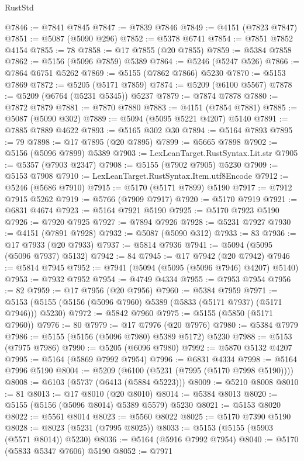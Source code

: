 \begin{lexlean}{RustStd}
\begin{coremodule}
@7846 := @7841 @7845
@7847 := @7839 @7846
@7849 := @4151 (@7823 @7847)
@7851 := @5087 (@5090 @296)
@7852 := @5378 @6741
@7854 := @7851 @7852 @4154
@7855 := 78
@7858 := @17 @7855 (@20 @7855)
@7859 := @5384 @7858
@7862 := @5156 (@5096 @7859) @5389
@7864 := @5246 (@5247 @526)
@7866 := @7864 @6751 @5262
@7869 := @5155 (@7862 @7866) @5230
@7870 := @5153 @7869
@7872 := @5205 (@5171 @7859)
@7874 := @5209 (@6100 @5567)
@7878 := @5209 (@6764 (@5231 @5345)) @5237
@7879 := @7874 @7878
@7880 := @7872 @7879
@7881 := @7870 @7880
@7883 := @4151 (@7854 @7881)
@7885 := @5087 (@5090 @302)
@7889 := @5094 (@5095 @5221 @4207) @5140
@7891 := @7885 @7889 @4622
@7893 := @5165 @302 @30
@7894 := @5164 @7893
@7895 := 79
@7898 := @17 @7895 (@20 @7895)
@7899 := @5665 @7898
@7902 := @5156 (@5096 @7899) @5389
@7903 := LexLeanTarget.RustSyntax.Lit.str
@7905 := @5357 (@7903 @2347)
@7908 := @5155 (@7902 @7905) @5230
@7909 := @5153 @7908
@7910 := LexLeanTarget.RustSyntax.Item.utf8Encode
@7912 := @5246 (@5686 @7910)
@7915 := @5170 (@5171 @7899) @5190
@7917 := @7912 @7915 @5262
@7919 := @5766 (@7909 @7917)
@7920 := @5170 @7919
@7921 := @6831 @4674
@7923 := @5164 @7921 @5190
@7925 := @5170 @7923 @5190
@7926 := @7920 @7925
@7927 := @7894 @7926
@7928 := @5231 @7927
@7930 := @4151 (@7891 @7928)
@7932 := @5087 (@5090 @312)
@7933 := 83
@7936 := @17 @7933 (@20 @7933)
@7937 := @5814 @7936
@7941 := @5094 (@5095 (@5096 @7937) @5132)
@7942 := 84
@7945 := @17 @7942 (@20 @7942)
@7946 := @5814 @7945
@7952 := @7941 (@5094 (@5095 (@5096 @7946) @4207) @5140)
@7953 := @7932 @7952
@7954 := @4749 @4334
@7955 := @7953 @7954
@7956 := 82
@7959 := @17 @7956 (@20 @7956)
@7960 := @5384 @7959
@7971 := @5153 (@5155 (@5156 (@5096 @7960) @5389 (@5833 (@5171 @7937) (@5171 @7946))) @5230)
@7972 := @5842 @7960
@7975 := @5155 (@5850 (@5171 @7960))
@7976 := 80
@7979 := @17 @7976 (@20 @7976)
@7980 := @5384 @7979
@7986 := @5155 (@5156 (@5096 @7980) @5389 @5172) @5230
@7988 := @5153 (@7975 @7986)
@7990 := @5205 (@6096 @7980)
@7992 := @5870 @5132 @4207
@7995 := @5164 (@5869 @7992 @7954)
@7996 := @6831 @4334
@7998 := @5164 @7996 @5190
@8004 := @5209 (@6100 (@5231 (@7995 (@5170 @7998 @5190))))
@8008 := @6103 (@5737 (@6413 (@5884 @5223)))
@8009 := @5210 @8008
@8010 := 81
@8013 := @17 @8010 (@20 @8010)
@8014 := @5384 @8013
@8020 := @5155 (@5156 (@5096 @8014) @5389 @5579) @5230
@8021 := @5153 @8020
@8022 := @5561 @8014
@8023 := @5560 @8022
@8025 := @5170 @7390 @5190
@8028 := @8023 (@5231 (@7995 @8025))
@8033 := @5153 (@5155 (@5903 (@5571 @8014)) @5230)
@8036 := @5164 (@5916 @7992 @7954)
@8040 := @5170 (@5833 @5347 @7606) @5190
@8052 := @7971

\end{coremodule}
\end{lexlean}
